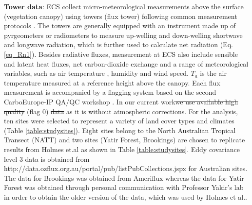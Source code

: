 \documentclass[fleqn,10pt]{wlscirep}
\providecommand{\DIFaddtex}[1]{{\protect\color{blue}\uwave{#1}}} %
\providecommand{\DIFdeltex}[1]{{\protect\color{red}\sout{#1}}}                      %
\providecommand{\DIFaddbegin}{} %
\providecommand{\DIFaddend}{} %
\providecommand{\DIFdelbegin}{} %
\providecommand{\DIFdelend}{} %
\providecommand{\DIFadd}[1]{\texorpdfstring{\DIFaddtex{#1}}{#1}} %
\providecommand{\DIFdel}[1]{\texorpdfstring{\DIFdeltex{#1}}{}} %
\begin{document}
 \textbf{Tower data}:
ECS collect micro-meteorological measurements above the surface (vegetation canopy) using towers (flux tower) following common measurement protocols \cite{baldocchi2001fluxnet}. The towers are generally equipped with an instrument made up of pyrgeometers or radiometers to measure up-welling and down-welling shortwave and longwave radiation, which is further used to calculate net radiation (Eq. \ref{eq_Rn1}). Besides radiative fluxes, measurement at ECS also include sensible and latent heat fluxes, net carbon-dioxide exchange and a range of meteorological variables, such as air temperature \DIFaddbegin \DIFadd{($T_{a}$ )}\DIFaddend , humidity and wind speed. $T_{a}$ is the air temperature measured at a reference height above the canopy. Each flux measurement is accompanied by a flagging system based on the second CarboEurope-IP QA/QC workshop \cite{gilberto2020fluxnet2015}. In our current work\DIFdelbegin \DIFdel{we use available high quality }\DIFdelend \DIFaddbegin \DIFadd{, we use high quality available data}\DIFaddend (flag 0) \DIFdelbegin \DIFdel{data }\DIFdelend as it is without atmospheric corrections. For the analysis, ten sites were selected to represent a variety of land cover types and climates (Table \ref{table:studysites}). Eight sites belong to the North Australian Tropical Transect (NATT) and two sites (Yatir Forest, Brookings) are chosen to replicate results from Holmes et.al\cite{holmes2009land} as shown in Table \ref{table:studysites}. Eddy covariance level 3 data is obtained from http://data.ozflux.org.au/portal/pub/listPubCollections.jspx for Australian sites. The data for Brookings was obtained from Ameriflux whereas the data for Yatir Forest was obtained through personal communication with Professor Yakir's lab in order to obtain the older version of the data, which was used by Holmes et al.\cite{holmes2009land}.
\end{document}
